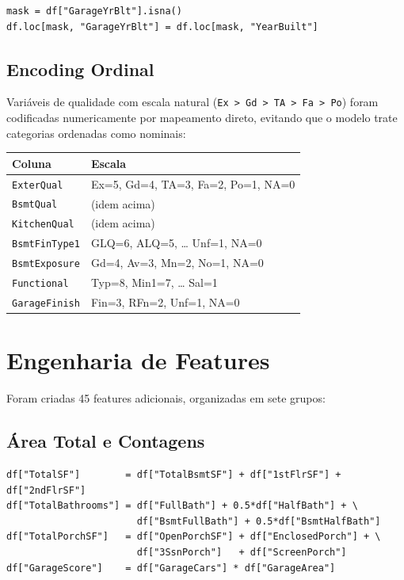 \documentclass[12pt,a4paper]{article}
\begin{document}
\begin{verbatim}
mask = df["GarageYrBlt"].isna()
df.loc[mask, "GarageYrBlt"] = df.loc[mask, "YearBuilt"]
\end{verbatim}
\subsection{Encoding Ordinal}
\label{sec:org6cd0c2c}

Variáveis de qualidade com escala natural (\texttt{Ex > Gd > TA > Fa > Po}) foram
codificadas numericamente por mapeamento direto, evitando que o modelo trate
categorias ordenadas como nominais:

\begin{center}
\begin{tabular}{ll}
Coluna & Escala\\
\hline
\texttt{ExterQual} & Ex=5, Gd=4, TA=3, Fa=2, Po=1, NA=0\\
\texttt{BsmtQual} & (idem acima)\\
\texttt{KitchenQual} & (idem acima)\\
\texttt{BsmtFinType1} & GLQ=6, ALQ=5, … Unf=1, NA=0\\
\texttt{BsmtExposure} & Gd=4, Av=3, Mn=2, No=1, NA=0\\
\texttt{Functional} & Typ=8, Min1=7, … Sal=1\\
\texttt{GarageFinish} & Fin=3, RFn=2, Unf=1, NA=0\\
\end{tabular}
\end{center}
\section{Engenharia de Features}
\label{sec:org4f9480b}

Foram criadas 45 features adicionais, organizadas em sete grupos:
\subsection{Área Total e Contagens}
\label{sec:org101d0ee}

\begin{verbatim}
df["TotalSF"]        = df["TotalBsmtSF"] + df["1stFlrSF"] + df["2ndFlrSF"]
df["TotalBathrooms"] = df["FullBath"] + 0.5*df["HalfBath"] + \
                       df["BsmtFullBath"] + 0.5*df["BsmtHalfBath"]
df["TotalPorchSF"]   = df["OpenPorchSF"] + df["EnclosedPorch"] + \
                       df["3SsnPorch"]   + df["ScreenPorch"]
df["GarageScore"]    = df["GarageCars"] * df["GarageArea"]
\end{verbatim}
\end{document}
